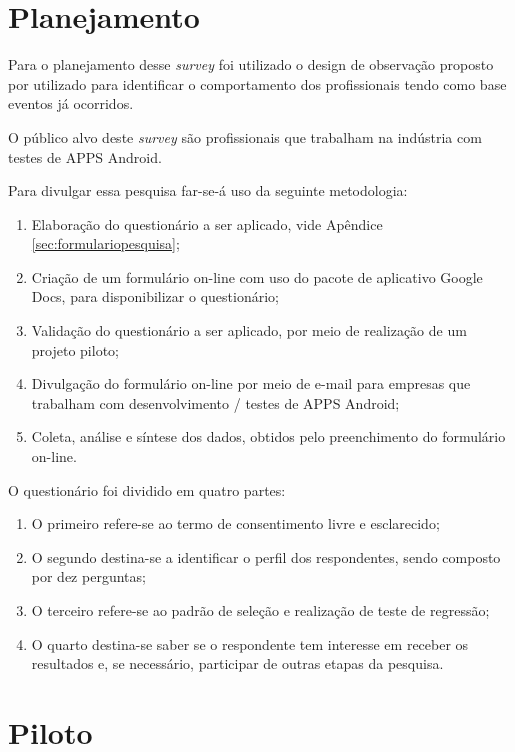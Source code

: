 \section{Planejamento}

Para o planejamento desse \textit{survey} foi utilizado o design de observação proposto por \cite{Kitchenham:2002:PSR:566493.566495} utilizado para identificar o comportamento dos profissionais tendo como base eventos já ocorridos.


O público alvo deste \textit{survey} são profissionais que trabalham na indústria com testes de \ac{APPS} Android.


Para divulgar essa pesquisa far-se-á uso da seguinte metodologia:

\begin{enumerate}
    \item Elaboração do questionário a ser aplicado, vide Apêndice \ref{sec:formulariopesquisa};
    \item Criação de um formulário on-line com uso do pacote de aplicativo Google Docs, para disponibilizar o questionário;
    \item Validação do questionário a ser aplicado, por meio de realização de um projeto piloto;
    \item Divulgação do formulário on-line por meio de e-mail para empresas que trabalham com desenvolvimento / testes de \ac{APPS} Android;
    \item Coleta, análise e síntese dos dados, obtidos pelo preenchimento do formulário on-line.
\end{enumerate}


O questionário foi dividido em quatro partes:

\begin{enumerate}
    \item O primeiro refere-se ao termo de consentimento livre e esclarecido;
    \item O segundo destina-se a identificar o perfil dos respondentes, sendo composto por dez perguntas;
    \item O terceiro refere-se ao padrão de seleção e realização de teste de regressão;
    \item O quarto destina-se saber se o respondente tem interesse em receber os resultados e, se necessário, participar de outras etapas da pesquisa.
\end{enumerate}

\section{Piloto}

